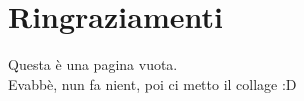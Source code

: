\chapter{Ringraziamenti}
Questa è una pagina vuota.\\
Evabbè, nun fa nient, poi ci metto il collage :D